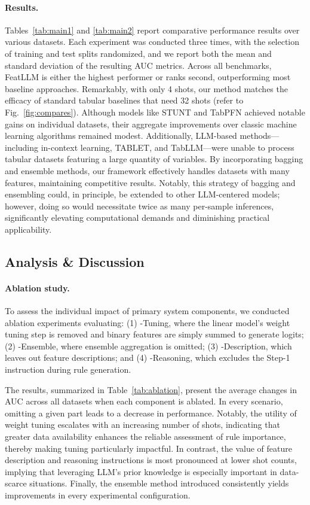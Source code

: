 \vspace*{-0.12in}
\paragraph{Results.}
Tables~\ref{tab:main1} and \ref{tab:main2} report comparative performance results over various datasets. Each experiment was conducted three times, with the selection of training and test splits randomized, and we report both the mean and standard deviation of the resulting AUC metrics. Across all benchmarks, \textsf{FeatLLM} is either the highest performer or ranks second, outperforming most baseline approaches. Remarkably, with only 4 shots, our method matches the efficacy of standard tabular baselines that need 32 shots (refer to Fig.~\ref{fig:compares}). Although models like STUNT and TabPFN achieved notable gains on individual datasets, their aggregate improvements over classic machine learning algorithms remained modest. Additionally, LLM-based methods—including in-context learning, TABLET, and TabLLM—were unable to process tabular datasets featuring a large quantity of variables. By incorporating bagging and ensemble methods, our framework effectively handles datasets with many features, maintaining competitive results. Notably, this strategy of bagging and ensembling could, in principle, be extended to other LLM-centered models; however, doing so would necessitate twice as many per-sample inferences, significantly elevating computational demands and diminishing practical applicability.

\subsection{Analysis \& Discussion}
\label{sec:analysis}
\paragraph{Ablation study.} To assess the individual impact of primary system components, we conducted ablation experiments evaluating: (1) \textsf{-Tuning}, where the linear model's weight tuning step is removed and binary features are simply summed to generate logits; (2) \textsf{-Ensemble}, where ensemble aggregation is omitted; (3) \textsf{-Description}, which leaves out feature descriptions; and (4) \textsf{-Reasoning}, which excludes the Step-1 instruction during rule generation.

The results, summarized in Table~\ref{tab:ablation}, present the average changes in AUC across all datasets when each component is ablated. In every scenario, omitting a given part leads to a decrease in performance. Notably, the utility of weight tuning escalates with an increasing number of shots, indicating that greater data availability enhances the reliable assessment of rule importance, thereby making tuning particularly impactful. In contrast, the value of feature description and reasoning instructions is most pronounced at lower shot counts, implying that leveraging LLM’s prior knowledge is especially important in data-scarce situations. Finally, the ensemble method introduced consistently yields improvements in every experimental configuration.

